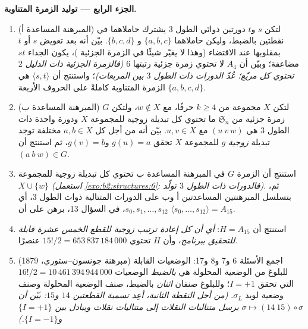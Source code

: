 \begin{problem}
\medskip
\noindent\textbf{الجزء الرابع --- توليد الزمرة المتناوبة.}
\begin{enumerate}[resume]
  \item (المبرهنة المساعدة أ) لتكن $s$ و$t$ دورتين ذواتَي الطول $3$
        يشترك حاملاهما في نقطتين بالضبط، وليكن حاملاهما $\{a, b, c\}$ و
        $\{b, c, d\}$. بيّن أنه بعد تعويض $s$ أو $t$
        بمقلوبها عند الاقتضاء (وهذا لا يغيّر شيئًا في الزمرة
        الجزئية )، يكون الجداء $st$ 
        مضاعفة؛ وبيّن أن $A_4$ لا تحتوي زمرة جزئية
        رتبتها $6$ \emph{(فالزمرة الجزئية ذات الدليل $2$ تحتوي كل
        مربّع؛ عُدّ الدورات ذات الطول $3$ بين المربعات)}؛ واستنتج
        أن $\langle s, t\rangle$ هي الزمرة المتناوبة كاملةً
        على الحروف الأربعة $\{a, b, c, d\}$.
  \item (المبرهنة المساعدة ب) لتكن $X$ مجموعة من $k \geq 4$ حرفًا، مع $w
        \notin X$،
        ولتكن $G$ زمرة جزئية من $\mathfrak{S}_n$ ما تحتوي كل تبديلة
        زوجية للمجموعة $X$ ودورة واحدة ذات الطول $3$ هي $(u\ v\ w)$ مع $u, v \in X$. بيّن
        أنه من أجل كل $a, b \in X$ مختلفة توجد تبديلة \emph{زوجية}
        $g$ للمجموعة $X$ تحقق $g(u) = a$ و$g(v) = b$، ثم
        استنتج أن $(a\ b\ w) \in G$.
  \item استنتج أن الزمرة $G$ في المبرهنة المساعدة ب تحتوي كل تبديلة
        زوجية للمجموعة $X \cup \{w\}$ \emph{(استعمل
        \cref{exo:b2:structures:6}: فالدورات ذات الطول $3$ تولّد)}.
        ثم، بتسلسل المبرهنتين المساعدتين أ وب على الدورات
        المتتالية ذوات الطول $3$، أي $s_0, s_1, \dots, s_{12}$، في السؤال 13،
        برهن على أن $\langle s_0, \dots, s_{12}\rangle = A_{15}$.
  \item استنتج أن $H = A_{15}$: \emph{أي أن كل إعادة ترتيب زوجية
        للقطع الخمس عشرة قابلة للتحقيق ببرنامج}، وأن $H$
        تحتوي $15!/2 = 653\,837\,184\,000$ عنصرًا.
  \item (مبرهنة جونسون--ستوري، 1879) اجمع الأسئلة 6 و7
        و8 و17: الوضعيات القابلة للبلوغ من الوضعية المحلولة
        هي \emph{بالضبط} الوضعيات $16!/2 =
        10\,461\,394\,944\,000$ التي تحقق $I = +1$؛
        وللبلوغ صنفان \emph{اثنان} بالضبط، صنف
        الوضعية المحلولة وصنف وضعية لويد
        $\sigma_L$. \emph{(من أجل النقطة الثانية، أعِد تسمية القطعتين
        $14$ و$15$: بيّن أن $\sigma \mapsto (14\ 15) \circ
        \sigma$ يرسل متتاليات النقلات إلى متتاليات نقلات
        ويبادل بين $\{I = +1\}$ و$\{I = -1\}$.)}
\end{enumerate}


\end{problem}
